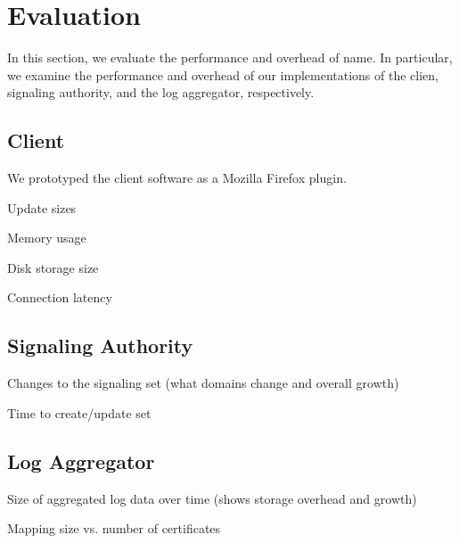 \section{Evaluation}
\label{sec:evaluation}

In this section, we evaluate the performance and overhead of \ac{name}. In
particular, we examine the performance and overhead of our implementations of
the clien, signaling authority, and the log aggregator, respectively.

\subsection{Client}

We prototyped the client software as a Mozilla Firefox plugin.

\begin{compactitem}
\item Update sizes
\item Memory usage
\item Disk storage size
\item Connection latency
\end{compactitem}

\subsection{Signaling Authority}

\begin{compactitem}
\item Changes to the signaling set (what domains change and overall growth)
\item Time to create/update set
\end{compactitem}

\subsection{Log Aggregator}

\begin{compactitem}
\item Size of aggregated log data over time (shows storage overhead and growth)
\item Mapping size vs. number of certificates
\end{compactitem}


